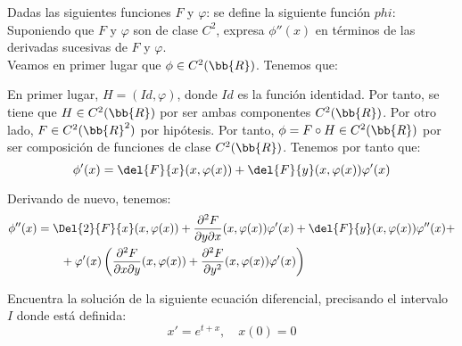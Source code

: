 \documentclass[12pt]{article}
\begin{document}
    \begin{ejercicio}
        Dadas las siguientes funciones $F$ y $\varphi$:
        se define la siguiente función $phi$:
        Suponiendo que $F$ y $\varphi$ son de clase $C^2$, expresa $\phi''(x)$ en términos de las derivadas sucesivas de $F$ y $\varphi$.\\

        Veamos en primer lugar que $\phi\in C^2(\bb{R})$. Tenemos que:
        \begin{figure}[H]
            \centering
        \end{figure}
        En primer lugar, $H=(Id, \varphi)$, donde $Id$ es la función identidad. Por tanto, se tiene que $H\in C^2(\bb{R})$ por ser ambas componentes $C^2(\bb{R})$. Por otro lado, $F\in C^2(\bb{R}^2)$ por hipótesis. Por tanto, $\phi=F\circ H\in C^2(\bb{R})$ por ser composición de funciones de clase $C^2(\bb{R})$.
        Tenemos por tanto que:
        \begin{equation*}
            \phi'(x) = \del{F}{x}(x,\varphi(x)) + \del{F}{y}(x,\varphi(x))\varphi'(x)
        \end{equation*}
        
        Derivando de nuevo, tenemos:
        \begin{align*}
            \phi''(x) &= \Del{2}{F}{x}(x,\varphi(x)) +
            \dfrac{\partial^2F}{\partial y \partial x} (x,\varphi(x))\varphi'(x) +
            \del{F}{y}(x,\varphi(x))\varphi''(x) +\\&\qquad +
            \varphi'(x)\left(\dfrac{\partial^2 F}{\partial x \partial y}(x,\varphi(x)) + \dfrac{\partial^2 F}{\partial y^2}(x,\varphi(x))\varphi'(x)\right)
        \end{align*}
    \end{ejercicio}

    \begin{ejercicio}
        Encuentra la solución de la siguiente ecuación diferencial, precisando el intervalo $I$ donde está definida:
        \begin{equation*}
            x' = e^{t+x}, \quad x(0) = 0
        \end{equation*}
    \end{ejercicio}
\end{document}
